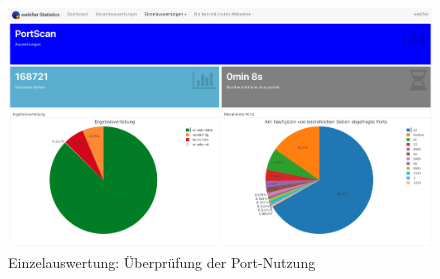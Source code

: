 \begin{landscape}
\begin{figure}[H]
  \centering
  \includegraphics[width=\textheight]{images/stats/portscan}
  \caption{Einzelauswertung: Überprüfung der Port-Nutzung}
  \label{fig:portscan}
\end{figure}

\end{landscape}
